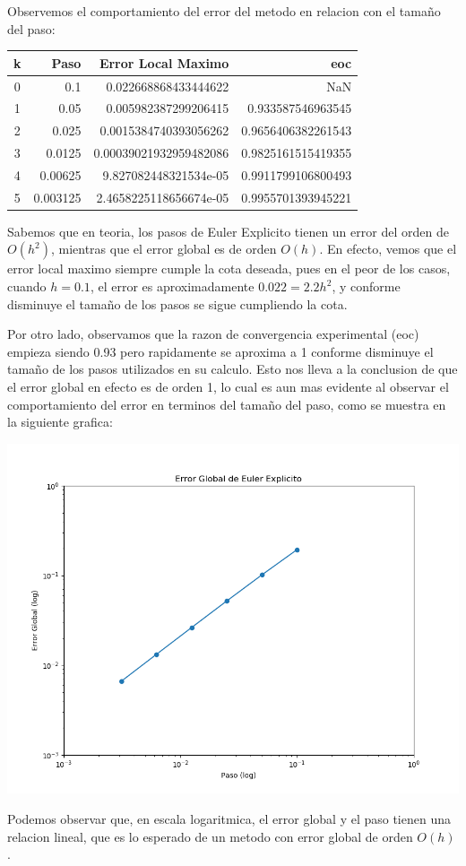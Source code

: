 \documentclass[11pt]{article}
\makeatletter
\def\maxwidth{\ifdim\Gin@nat@width>\linewidth\linewidth
    \else\Gin@nat@width\fi}
\let\Oldincludegraphics\includegraphics
\renewcommand{\includegraphics}[1]{\Oldincludegraphics[width=.8\maxwidth]{#1}}
\makeatother
\begin{document}
    Observemos el comportamiento del error del metodo en relacion con el
tamaño del paso:
\begin{center}
\begin{tabular}{|c|r r r|} 
 \hline 
k & Paso & Error Local Maximo & eoc \\ \hline 
0 & 0.1 & 0.022668868433444622 & NaN \\
1 & 0.05 & 0.005982387299206415 & 0.933587546963545 \\
2 & 0.025 & 0.0015384740393056262 & 0.9656406382261543 \\ 
3 & 0.0125 & 0.00039021932959482086 & 0.9825161515419355 \\ 
4 & 0.00625 & 9.827082448321534e-05 & 0.9911799106800493 \\ 
5 & 0.003125 & 2.4658225118656674e-05 & 0.9955701393945221 \\ 
\hline 
 \end{tabular}
 \end{center}

    Sabemos que en teoria, los pasos de Euler Explicito tienen un error del
orden de \(O(h^2)\), mientras que el error global es de orden \(O(h)\).
En efecto, vemos que el error local maximo siempre cumple la cota
deseada, pues en el peor de los casos, cuando \(h=0.1\), el error es
aproximadamente \(0.022 = 2.2h^2\), y conforme disminuye el tamaño de
los pasos se sigue cumpliendo la cota.

Por otro lado, observamos que la razon de convergencia experimental
(eoc) empieza siendo 0.93 pero rapidamente se aproxima a 1 conforme
disminuye el tamaño de los pasos utilizados en su calculo. Esto nos
lleva a la conclusion de que el error global en efecto es de orden 1, lo
cual es aun mas evidente al observar el comportamiento del error en
terminos del tamaño del paso, como se muestra en la siguiente grafica:


    \begin{center}
    \includegraphics{fig 1.2.png}
    \end{center}
    
    Podemos observar que, en escala logaritmica, el error global y el paso
tienen una relacion lineal, que es lo esperado de un metodo con error
global de orden \(O(h)\).


    
    
    
    
\end{document}
